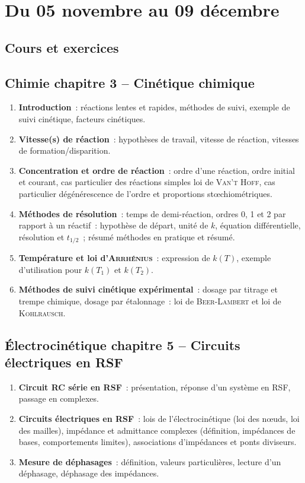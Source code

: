 \documentclass[a4paper, 12pt, final, garamond]{book}
\begin{document}
\setcounter{chapter}{10}

\chapter{Du 05 novembre au 09 d\'ecembre}

\section{Cours et exercices}
\section*{Chimie chapitre 3 -- Cinétique chimique}
\begin{enumerate}[label=\Roman*]
    \item \textbf{Introduction}~: réactions lentes et rapides, méthodes de
        suivi, exemple de suivi cinétique, facteurs cinétiques.
    \item \textbf{Vitesse(s) de réaction}~: hypothèses de travail, vitesse de
        réaction, vitesses de formation/disparition.
    \item \textbf{Concentration et ordre de réaction}~: ordre d'une réaction,
        ordre initial et courant, cas particulier des réactions simples loi de
        \textsc{Van't Hoff}, cas particulier dégénérescence de l'ordre et
        proportions stœchiométriques.
    \item \textbf{Méthodes de résolution}~: temps de demi-réaction, ordres 0, 1
        et 2 par rapport à un réactif~: hypothèse de départ, unité de $k$,
        équation différentielle, résolution et $t_{1/2}$~; résumé méthodes en
        pratique et résumé.
    \item \textbf{Température et loi d'\textsc{Arrhénius}}~: expression de
        $k(T)$, exemple d'utilisation pour $k(T_1)$ et $k(T_2)$.
    \item \textbf{Méthodes de suivi cinétique expérimental}~: dosage par
        titrage et trempe chimique, dosage par étalonnage~: loi de
        \textsc{Beer-Lambert} et loi de \textsc{Kohlrausch}.
\end{enumerate}

\section*{Électrocinétique chapitre 5 -- Circuits électriques en RSF}
\begin{enumerate}[label=\Roman*]
    \item \textbf{Circuit RC série en RSF}~: présentation, réponse d'un système
        en RSF, passage en complexes.
    \item \textbf{Circuits électriques en RSF}~: lois de l'électrocinétique (loi
        des nœuds, loi des mailles), impédance et admittance complexes
        (définition, impédances de bases, comportements limites), associations
        d'impédances et ponts diviseurs.
    \item \textbf{Mesure de déphasages}~: définition, valeurs particulières,
        lecture d'un déphasage, déphasage des impédances.
\end{enumerate}
\end{document}
